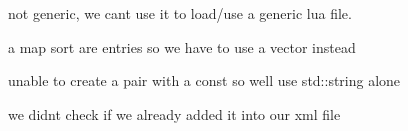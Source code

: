 
\begin{DoxyRefList}
\item[\label{bug__bug000001}%
\hypertarget{bug__bug000001}{}%
Class \hyperlink{class_lua}{Lua} ]not generic, we can\textquotesingle{}t use it to load/use a generic lua file.  
\item[\label{bug__bug000002}%
\hypertarget{bug__bug000002}{}%
Member \hyperlink{class_score_a1413934ad0d6ab0cceb364b093f8f038}{Score\+:\+:get\+Top\+N} (int n)]a map sort are entries so we have to use a vector instead 

unable to create a pair with a const so we\textquotesingle{}ll use std\+::string alone 
\item[\label{bug__bug000003}%
\hypertarget{bug__bug000003}{}%
Member \hyperlink{class_xml_save_a25c1aef0c3bc8589dc7224c332a792a1}{Xml\+Save\+:\+:save\+Maze} (char const $\ast$map, int width, int width)]we didnt check if we already added it into our xml file
\end{DoxyRefList}